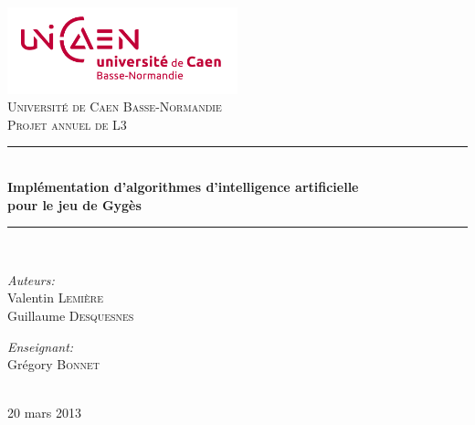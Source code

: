 \newcommand{\HRule}{\rule{\linewidth}{0.5mm}}

\begin{titlepage}
\begin{center}

\includegraphics[width=0.5\textwidth]{images/logo.jpg}~\\[1cm]

\textsc{\LARGE Université de Caen Basse-Normandie}\\[1.5cm]

\textsc{\Large Projet annuel de L3}\\[0.5cm]

\HRule \\[0.4cm]
{ \huge \bfseries Implémentation d'algorithmes d'intelligence artificielle\\ pour le jeu de Gygès}\\[0.4cm]

\HRule \\[1.5cm]

\begin{minipage}{0.4\textwidth}
\begin{flushleft} \large
\emph{Auteurs:}\\
Valentin \textsc{Lemière}\\
Guillaume \textsc{Desquesnes}
\end{flushleft}
\end{minipage}
\begin{minipage}{0.4\textwidth}
\begin{flushright} \large
\emph{Enseignant:} \\
Grégory \textsc{Bonnet}\\
~\\
\end{flushright}
\end{minipage}

\vfill

{\large 20 mars 2013}

\end{center}
\end{titlepage}
